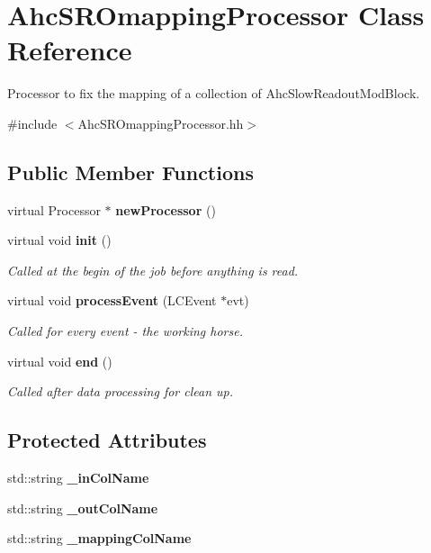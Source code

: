\section{AhcSROmappingProcessor Class Reference}
\label{classAhcSROmappingProcessor}


Processor to fix the mapping of a collection of AhcSlowReadoutModBlock.  


{\ttfamily \#include $<$AhcSROmappingProcessor.hh$>$}\subsection*{Public Member Functions}
\begin{DoxyCompactItemize}
\item 
virtual Processor $\ast$ {\bfseries newProcessor} ()\label{classAhcSROmappingProcessor_acdb27fbf3cabcefac542316a507e4ecd}

\item 
virtual void {\bf init} ()
\begin{DoxyCompactList}\small\item\em Called at the begin of the job before anything is read. \item\end{DoxyCompactList}\item 
virtual void {\bf processEvent} (LCEvent $\ast$evt)\label{classAhcSROmappingProcessor_a6aed22ae961f2d83301ef5bd3ecbac22}

\begin{DoxyCompactList}\small\item\em Called for every event -\/ the working horse. \item\end{DoxyCompactList}\item 
virtual void {\bf end} ()\label{classAhcSROmappingProcessor_a1e2654e41cb9d86e674d671e2dffddf8}

\begin{DoxyCompactList}\small\item\em Called after data processing for clean up. \item\end{DoxyCompactList}\end{DoxyCompactItemize}
\subsection*{Protected Attributes}
\begin{DoxyCompactItemize}
\item 
std::string {\bfseries \_\-inColName}\label{classAhcSROmappingProcessor_a79fb23db5c3484c5943e6e16f696a4b2}

\item 
std::string {\bfseries \_\-outColName}\label{classAhcSROmappingProcessor_aea0657c8950e0ebce40bac16f59ec2d8}

\item 
std::string {\bfseries \_\-mappingColName}\label{classAhcSROmappingProcessor_a0418b9e5c81b0b44fde4b77a7290366f}

\end{DoxyCompactItemize}
